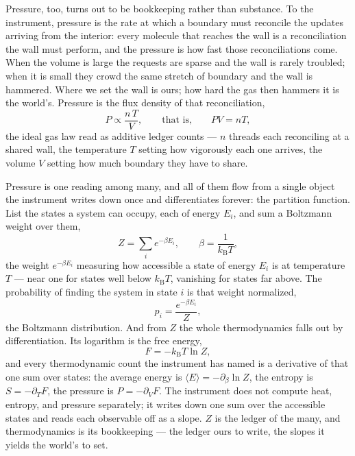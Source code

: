 Pressure, too, turns out to be bookkeeping rather than substance. To the instrument, pressure is the rate at
which a boundary must reconcile the updates arriving from the interior: every molecule that reaches the wall
is a reconciliation the wall must perform, and the pressure is how fast those reconciliations come. When the
volume is large the requests are sparse and the wall is rarely troubled; when it is small they crowd the same
stretch of boundary and the wall is hammered. Where we set the wall is ours; how hard the gas then hammers it
is the world's. Pressure is the flux density of that reconciliation,
\begin{equation}
  P \propto \frac{n\,T}{V}, \qquad\text{that is,}\qquad PV = nT,
\end{equation}
the ideal gas law read as additive ledger counts --- $n$ threads each reconciling at a shared wall, the
temperature $T$ setting how vigorously each one arrives, the volume $V$ setting how much boundary they have to
share.

Pressure is one reading among many, and all of them flow from a single object the instrument writes down once
and differentiates forever: the partition function. List the states a system can occupy, each of energy $E_i$,
and sum a Boltzmann weight over them,
\begin{equation}
  Z = \sum_i e^{-\beta E_i}, \qquad \beta = \frac{1}{k_{\mathrm{B}} T},
\end{equation}
the weight $e^{-\beta E_i}$ measuring how accessible a state of energy $E_i$ is at temperature $T$ --- near one
for states well below $k_{\mathrm{B}} T$, vanishing for states far above. The probability of finding the system
in state $i$ is that weight normalized,
\begin{equation}
  p_i = \frac{e^{-\beta E_i}}{Z},
\end{equation}
the Boltzmann distribution. And from $Z$ the whole thermodynamics falls out by differentiation. Its logarithm
is the free energy,
\begin{equation}
  F = -k_{\mathrm{B}} T \ln Z,
\end{equation}
and every thermodynamic count the instrument has named is a derivative of that one sum over states: the average
energy is $\langle E\rangle = -\partial_\beta \ln Z$, the entropy is $S = -\partial_T F$, the pressure is $P =
-\partial_V F$. The instrument does not compute heat, entropy, and pressure separately; it writes down one sum
over the accessible states and reads each observable off as a slope. $Z$ is the ledger of the many, and
thermodynamics is its bookkeeping --- the ledger ours to write, the slopes it yields the world's to set.

